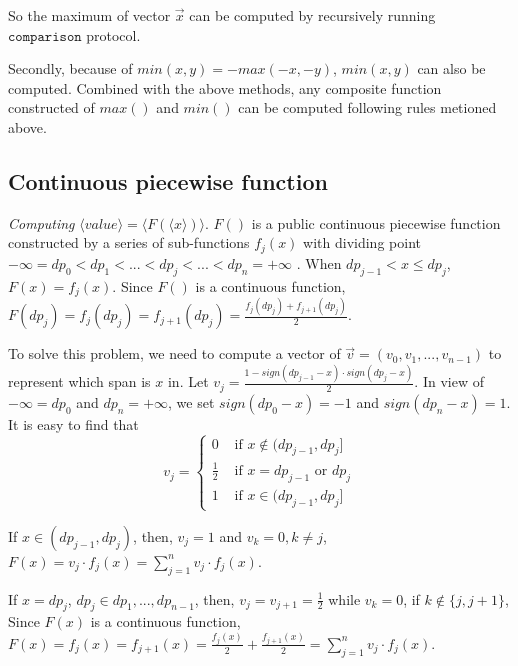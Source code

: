 \documentclass[letterpaper]{article} %
\begin{document}
       So the maximum of vector $\overrightarrow{x}$ can be computed by recursively running $\mathtt{comparison}$ protocol.

       Secondly, because of $min(x,y)=-max(-x,-y)$,  $min(x,y)$ can also be computed.
       Combined with the above methods,
       any composite function constructed of $max()$ and $min()$ can be computed following rules metioned above.






       \subsection{Continuous piecewise function}
       \emph{Computing} $\langle value\rangle  = \langle F(\langle x\rangle)\rangle $.
       $F()$ is a public continuous piecewise function constructed by a series of sub-functions $f_{j}(x)$
       with dividing point $-\infty =dp_{0}<dp_{1}<...<dp_{j}<...<dp_{n}=+\infty$ .
       When $dp_{j-1}< x\leq dp_{j}$, $F(x) =f_{j}(x)$.
       Since $F()$ is a continuous function, $F(dp_{j}) =f_{j}(dp_{j})=f_{j+1}(dp_{j})=\frac{f_{j}(dp_{j})+f_{j+1}(dp_{j})}{2}$.


       To solve this problem, we need to compute a vector of
       $\overrightarrow{v}=(v_{0},v_{1},...,v_{n-1})$ to represent which span is $x$ in.
       Let $v_{j} = \frac{1-sign(dp_{j-1}-x)\cdot sign(dp_{j}-x)}{2}$.
       In view of $-\infty =dp_{0}$ and $dp_{n}=+\infty$,
       we set $sign(dp_{0}-x)=-1$ and $sign(dp_{n}-x)=1$.
       It is easy to find that
       $$v_{j}=\begin{cases}
           0 & \text{ if } x\notin (dp_{j-1},dp_{j}] \\
           \frac{1}{2} & \text{ if } x = dp_{j-1} \text{ or } dp_{j}\\
           1 & \text{ if } x\in (dp_{j-1},dp_{j}]
          \end{cases}$$

       If $x\in (dp_{j-1},dp_{j})$, then, $v_{j}=1$ and $v_{k}=0,k\neq j$,$F(x)=v_{j}\cdot f_{j}(x)=\sum_{j=1}^{n}v_{j}\cdot f_{j}(x)$.

       If $x=dp_{j} $, $ dp_{j}\in {dp_{1},...,dp_{n-1}}$,
       then, $v_{j}=v_{j+1}=\frac{1}{2}$ while $v_{k}=0$, if $ k\notin \{j,j+1\}$,
       Since $F(x)$ is a continuous function,
       $F(x)=f_{j}(x)=f_{j+1}(x)=\frac{f_{j}(x)}{2}+\frac{f_{j+1}(x)}{2}=\sum_{j=1}^{n}v_{j}\cdot f_{j}(x)$.
\end{document}
